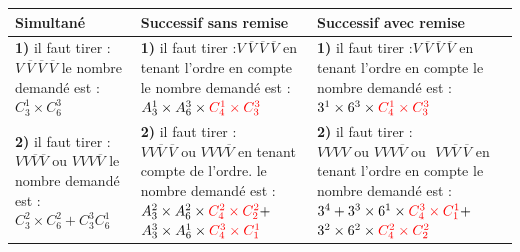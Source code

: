 \documentclass[12pt,a4paper]{article}
\begin{document}
\raggedright
\begin{tabular}{|p{6cm}|p{6cm}|p{5cm}|}
\hline
\textbf{Simultané} & \textbf{Successif sans remise} & \textbf{Successif avec remise}\\
\hline
\makecell[l]{\textbf{1)} il faut tirer : $V \ \overline{V} \ \overline{V} \ \overline{V}$\\ le nombre demandé est :$C_3^1 \times C_6^3 $} & \makecell[l]{\textbf{1)} il faut tirer :$ V \ \overline{V} \ \overline{V} \ \overline{V}$\\ en tenant l'ordre en compte\\ le nombre demandé est :\\$ A_3^1 \times A_6^3 \times \color{red} C_4^1 \times C_3^3$} & \makecell[l]{\textbf{1)} il faut tirer :$ V \ \overline{V} \ \overline{V} \ \overline{V}$\\ en tenant l'ordre en compte\\ le nombre demandé est :\\$ 3^1 \times 6^3 \times \color{red} C_4^1 \times C_3^3 $} \\
\hline
\makecell[l]{\textbf{2)} il faut tirer :\\ $V V \overline{V} \overline{V} \text{ ou } V V V \overline{V}$\\ le nombre demandé est :\\$ C_3^2 \times C_6^2 + C_3^3 C_6^1 $} & \makecell[l]{\textbf{2)} il faut tirer : $V V \overline{V} \ \overline{V} \text{ ou } V V V \overline{V}$\\ en tenant compte de l'ordre.\\ le nombre demandé est :\\$ A_3^2 \times A_6^2 \times \color{red} C_4^2 \times C_2^2 \color{black} +$ \\$ A_3^3 \times A_6^1 \times \color{red} C_4^3 \times C_1^1 $} & \makecell[l]{\textbf{2)} il faut tirer :\\$ V V V V \text{ ou } V V V \overline{V} \text{ ou }$\\$ V V \overline{V} \ \overline{V} $\\ en tenant l'ordre en compte\\ le nombre demandé est :\\$ 3^4 + 3^3 \times 6^1 \times \color{red} C_4^3 \times C_1^1 \color{black} + $\\$3^2 \times 6^2 \times \color{red} C_4^2 \times C_2^2$} \\
\hline

\end{tabular}
\end{document}
